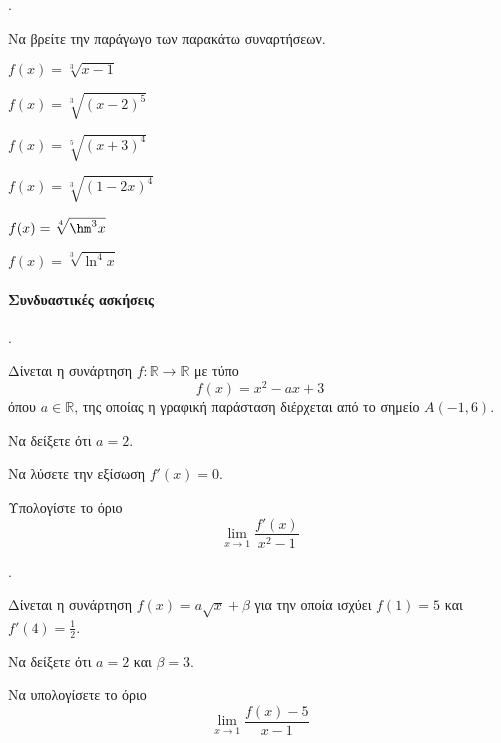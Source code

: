 \documentclass[11pt,a4paper,twocolumn]{article}
\newcounter{askhsh}
\newcommand{\askhsh}{{\large\theaskhsh.}\ \addtocounter{askhsh}{1}}
\begin{document}
\askhsh Να βρείτε την παράγωγο των παρακάτω συναρτήσεων.
\begin{multicols}{2}
\begin{alist}
\item $ f(x)=\sqrt[3]{x-1} $
\item $ f(x)=\sqrt[3]{(x-2)^5}$
\item $ f(x)=\sqrt[5]{(x+3)^4}$
\item $ f(x)=\sqrt[3]{(1-2x)^4}$
\item $ f(x)=\sqrt[4]{\hm^3{x}}$
\item $ f(x)=\sqrt[3]{\ln^4{x}}$
\end{alist}
\end{multicols}

\paragraph{Συνδυαστικές ασκήσεις}
\askhsh Δίνεται η συνάρτηση $f:\mathbb{R}\to\mathbb{R}$ με τύπο
\[ f(x)=x^2-ax+3 \]
όπου $a\in\mathbb{R}$, της οποίας η γραφική παράσταση διέρχεται από το σημείο $A(-1,6)$.
\begin{alist}
\item Να δείξετε ότι $a=2$.
\item Να λύσετε την εξίσωση $f'(x)=0$.
\item Υπολογίστε το όριο
\[\lim_{x\to1}{\frac{f'(x)}{x^2-1}}\]
\end{alist}
\askhsh Δίνεται η συνάρτηση $f(x)=a\sqrt{x}+\beta$ για την οποία ισχύει $f(1)=5$ και $f'(4)=\frac{1}{2}$.
\begin{alist}
\item Να δείξετε ότι $a=2$ και $\beta=3$.
\item Να υπολογίσετε το όριο
\[\lim_{x\to1}{\frac{f(x)-5}{x-1}}\]
\end{alist}
\end{document}
